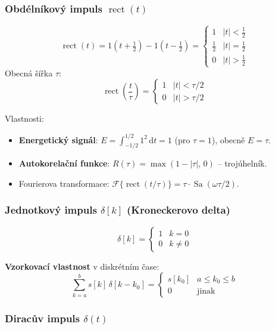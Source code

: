 \documentclass[12pt,a4paper]{article}
\newcommand{\FT}{\mathcal{F}}
\newcommand{\rect}{\operatorname{rect}}
\newcommand{\dd}{\mathrm{d}}
\begin{document}
\subsubsection*{Obdélníkový impuls $\rect(t)$}

\begin{matBox}[Definice]
\[
  \rect(t) = 1\!\left(t + \tfrac{1}{2}\right) - 1\!\left(t - \tfrac{1}{2}\right)
  = \begin{cases} 1 & |t| < \tfrac{1}{2} \\ \tfrac{1}{2} & |t| = \tfrac{1}{2} \\ 0 & |t| > \tfrac{1}{2} \end{cases}
\]
Obecná šířka $\tau$:
\[
  \rect\!\left(\frac{t}{\tau}\right) = \begin{cases} 1 & |t| < \tau/2 \\ 0 & |t| > \tau/2 \end{cases}
\]
\end{matBox}

Vlastnosti:
\begin{itemize}
  \item \textbf{Energetický signál}: $E = \int_{-1/2}^{1/2}1^2\,\dd t = 1$ (pro $\tau=1$), obecně $E=\tau$.
  \item \textbf{Autokorelační funkce}: $R(\tau) = \max(1-|\tau|,\,0)$ – trojúhelník.
  \item Fourierova transformace: $\FT\{\rect(t/\tau)\} = \tau\cdot\operatorname{Sa}(\omega\tau/2)$.
\end{itemize}

\subsubsection*{Jednotkový impuls $\delta[k]$ (Kroneckerovo delta)}

\begin{matBox}[Definice]
\[
  \delta[k] = \begin{cases} 1 & k = 0 \\ 0 & k \neq 0 \end{cases}
\]
\end{matBox}

\textbf{Vzorkovací vlastnost} v diskrétním čase:
\[
  \sum_{k=a}^{b} s[k]\,\delta[k - k_0] = \begin{cases} s[k_0] & a \leq k_0 \leq b \\ 0 & \text{jinak} \end{cases}
\]

\subsubsection*{Diracův impuls $\delta(t)$}
\end{document}
